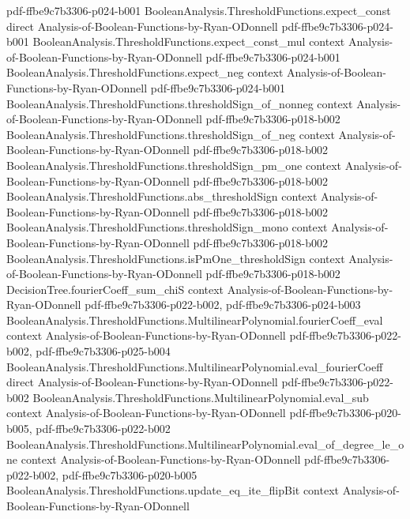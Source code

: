 \begin{theorem}
  {pdf-ffbe9c7b3306-p024-b001}
\proofstep
  {BooleanAnalysis.ThresholdFunctions.expect_const}
  {direct}
  {Analysis-of-Boolean-Functions-by-Ryan-ODonnell}
  {pdf-ffbe9c7b3306-p024-b001}
\proofstep
  {BooleanAnalysis.ThresholdFunctions.expect_const_mul}
  {context}
  {Analysis-of-Boolean-Functions-by-Ryan-ODonnell}
  {pdf-ffbe9c7b3306-p024-b001}
\proofstep
  {BooleanAnalysis.ThresholdFunctions.expect_neg}
  {context}
  {Analysis-of-Boolean-Functions-by-Ryan-ODonnell}
  {pdf-ffbe9c7b3306-p024-b001}
\proofstep
  {BooleanAnalysis.ThresholdFunctions.thresholdSign_of_nonneg}
  {context}
  {Analysis-of-Boolean-Functions-by-Ryan-ODonnell}
  {pdf-ffbe9c7b3306-p018-b002}
\proofstep
  {BooleanAnalysis.ThresholdFunctions.thresholdSign_of_neg}
  {context}
  {Analysis-of-Boolean-Functions-by-Ryan-ODonnell}
  {pdf-ffbe9c7b3306-p018-b002}
\proofstep
  {BooleanAnalysis.ThresholdFunctions.thresholdSign_pm_one}
  {context}
  {Analysis-of-Boolean-Functions-by-Ryan-ODonnell}
  {pdf-ffbe9c7b3306-p018-b002}
\proofstep
  {BooleanAnalysis.ThresholdFunctions.abs_thresholdSign}
  {context}
  {Analysis-of-Boolean-Functions-by-Ryan-ODonnell}
  {pdf-ffbe9c7b3306-p018-b002}
\proofstep
  {BooleanAnalysis.ThresholdFunctions.thresholdSign_mono}
  {context}
  {Analysis-of-Boolean-Functions-by-Ryan-ODonnell}
  {pdf-ffbe9c7b3306-p018-b002}
\proofstep
  {BooleanAnalysis.ThresholdFunctions.isPmOne_thresholdSign}
  {context}
  {Analysis-of-Boolean-Functions-by-Ryan-ODonnell}
  {pdf-ffbe9c7b3306-p018-b002}
\proofstep
  {DecisionTree.fourierCoeff_sum_chiS}
  {context}
  {Analysis-of-Boolean-Functions-by-Ryan-ODonnell}
  {pdf-ffbe9c7b3306-p022-b002,
    pdf-ffbe9c7b3306-p024-b003}
\proofstep
  {BooleanAnalysis.ThresholdFunctions.MultilinearPolynomial.fourierCoeff_eval}
  {context}
  {Analysis-of-Boolean-Functions-by-Ryan-ODonnell}
  {pdf-ffbe9c7b3306-p022-b002,
    pdf-ffbe9c7b3306-p025-b004}
\proofstep
  {BooleanAnalysis.ThresholdFunctions.MultilinearPolynomial.eval_fourierCoeff}
  {direct}
  {Analysis-of-Boolean-Functions-by-Ryan-ODonnell}
  {pdf-ffbe9c7b3306-p022-b002}
\proofstep
  {BooleanAnalysis.ThresholdFunctions.MultilinearPolynomial.eval_sub}
  {context}
  {Analysis-of-Boolean-Functions-by-Ryan-ODonnell}
  {pdf-ffbe9c7b3306-p020-b005,
    pdf-ffbe9c7b3306-p022-b002}
\proofstep
  {BooleanAnalysis.ThresholdFunctions.MultilinearPolynomial.eval_of_degree_le_one}
  {context}
  {Analysis-of-Boolean-Functions-by-Ryan-ODonnell}
  {pdf-ffbe9c7b3306-p022-b002,
    pdf-ffbe9c7b3306-p020-b005}
\proofstep
  {BooleanAnalysis.ThresholdFunctions.update_eq_ite_flipBit}
  {context}
  {Analysis-of-Boolean-Functions-by-Ryan-ODonnell}

\end{theorem}
